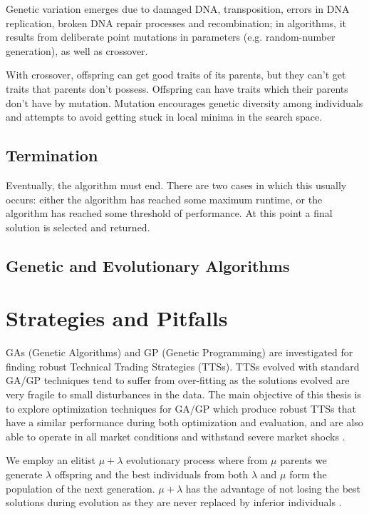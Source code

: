 Genetic variation emerges due to damaged DNA, transposition, errors in DNA replication, broken DNA repair processes and recombination; in algorithms, it results from deliberate point mutations in parameters (e.g. random-number generation), as well as crossover.

With crossover, offspring can get good traits of its parents, but they can't get traits that parents don't possess.
Offspring can have traits which their parents don't have by mutation.  Mutation encourages genetic diversity among individuals and
attempts to avoid getting stuck in local minima in the search space.

\subsection{Termination}
Eventually, the algorithm must end. There are two cases in which this usually occurs: either the algorithm has reached some maximum runtime, or the algorithm has reached some threshold of performance. At this point a final solution is selected and returned.

\subsection{Genetic and Evolutionary Algorithms}









\section{Strategies and Pitfalls}

GAs (Genetic Algorithms) and GP (Genetic Programming) are investigated
for finding robust Technical Trading Strategies (TTSs). TTSs evolved with
standard GA/GP techniques tend to suffer from over-fitting as the solutions
evolved are very fragile to small disturbances in the data. The main objective
of this thesis is to explore optimization techniques for GA/GP which
produce robust TTSs that have a similar performance during both optimization
and evaluation, and are also able to operate in all market conditions
and withstand severe market shocks \cite{Lindquist2017}.




We employ an elitist $\mu + \lambda$ evolutionary process where from $\mu$ parents we
generate $\lambda$ offspring and the best individuals from both $\lambda$ and $\mu$ form the
population of the next generation.  $\mu + \lambda$ has the advantage of not losing
the best solutions during evolution as they are never replaced by inferior
individuals \cite{Lindquist2017}.


